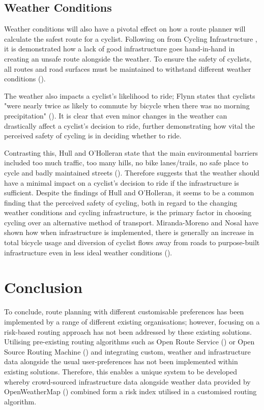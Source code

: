 \subsection{Weather Conditions}
\label{litrev:weatherconditions}
Weather conditions will also have a pivotal effect on how a route planner will calculate the safest route for a cyclist. Following on from Cycling Infrastructure , it is demonstrated how a lack of good infrastructure goes hand-in-hand in creating an unsafe route alongside the weather. To ensure the safety of cyclists, all routes and road surfaces must be maintained to withstand different weather conditions (\cite{shoman_evaluation_2023}).

The weather also impacts a cyclist's likelihood to ride; Flynn states that cyclists "were nearly twice as likely to commute by bicycle when there was no morning precipitation" (\cite{flynn_weather_2012}). It is clear that even minor changes in the weather can drastically affect a cyclist's decision to ride, further demonstrating how vital the perceived safety of cycling is in deciding whether to ride. 

Contrasting this, Hull and O'Holleran state that the main environmental barriers included too much traffic, too many hills, no bike lanes/trails, no safe place to cycle and badly maintained streets (\cite{hull_bicycle_2014}). Therefore suggests that the weather should have a minimal impact on a cyclist's decision to ride if the infrastructure is sufficient. Despite the findings of Hull and O'Holleran, it seems to be a common finding that the perceived safety of cycling, both in regard to the changing weather conditions and cycling infrastructure, is the primary factor in choosing cycling over an alternative method of transport. Miranda-Moreno and Nosal have shown how when infrastructure is implemented, there is generally an increase in total bicycle usage and diversion of cyclist flows away from roads to purpose-built infrastructure even in less ideal weather conditions (\cite{miranda-moreno_weather_2011}).

\section{Conclusion}
\label{litrev:conclusion}

To conclude, route planning with different customisable preferences has been implemented by a range of different existing organisations; however, focusing on a risk-based routing approach has not been addressed by these existing solutions. Utilising pre-existing routing algorithms such as Open Route Service (\cite{noauthor_openrouteservice_nodate}) or Open Source Routing Machine (\cite{noauthor_project_nodate}) and integrating custom, weather and infrastructure data alongside the usual user-preferences has not been implemented within existing solutions. Therefore, this enables a unique system to be developed whereby crowd-sourced infrastructure data alongside weather data provided by OpenWeatherMap (\cite{noauthor_urrent_nodate}) combined form a risk index utilised in a customised routing algorithm.

